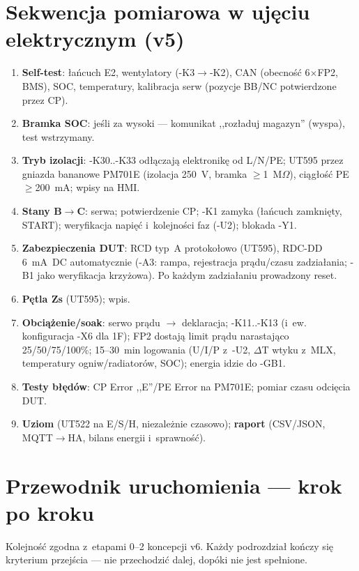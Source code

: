 \documentclass[11pt,a4paper]{article}
\newcommand{\ohm}{$\Omega$}
\begin{document}
\section{Sekwencja pomiarowa w ujęciu elektrycznym (v5)}
\begin{enumerate}
\item \textbf{Self-test}: łańcuch E2, wentylatory (-K3$\to$-K2), CAN (obecność 6$\times$FP2, BMS), SOC,
temperatury, kalibracja serw (pozycje BB/NC potwierdzone przez CP).
\item \textbf{Bramka SOC}: jeśli za wysoki --- komunikat ,,rozładuj magazyn'' (wyspa), test wstrzymany.
\item \textbf{Tryb izolacji}: -K30..-K33 odłączają elektronikę od L/N/PE; UT595 przez gniazda bananowe
PM701E (izolacja 250~V, bramka $\ge$1~M\ohm{}), ciągłość PE $\ge$200~mA; wpisy na HMI.
\item \textbf{Stany B$\to$C}: serwa; potwierdzenie CP; -K1 zamyka (łańcuch zamknięty, START); weryfikacja
napięć i~kolejności faz (-U2); blokada -Y1.
\item \textbf{Zabezpieczenia DUT}: RCD typ~A protokołowo (UT595), RDC-DD 6~mA~DC automatycznie (-A3: rampa,
rejestracja prądu/czasu zadziałania; -B1 jako weryfikacja krzyżowa). Po każdym zadziałaniu prowadzony reset.
\item \textbf{Pętla Zs} (UT595); wpis.
\item \textbf{Obciążenie/soak}: serwo prądu $\to$ deklaracja; -K11..-K13 (i~ew. konfiguracja -X6 dla 1F);
FP2 dostają limit prądu narastająco 25/50/75/100\%; 15--30~min logowania (U/I/P z~-U2, $\Delta$T wtyku
z~MLX, temperatury ogniw/radiatorów, SOC); energia idzie do -GB1.
\item \textbf{Testy błędów}: CP Error ,,E''/PE Error na PM701E; pomiar czasu odcięcia DUT.
\item \textbf{Uziom} (UT522 na E/S/H, niezależnie czasowo); \textbf{raport} (CSV/JSON, MQTT$\to$HA,
bilans energii i~sprawność).
\end{enumerate}

\section{Przewodnik uruchomienia --- krok po kroku}
\label{sec:uruchomienie}
Kolejność zgodna z~etapami 0--2 koncepcji v6. Każdy podrozdział kończy się kryterium przejścia --- nie
przechodzić dalej, dopóki nie jest spełnione.
\end{document}
